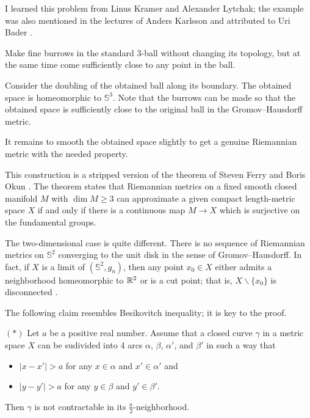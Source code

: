 I learned this problem from Linus Kramer and Alexander Lytchak;
the example was also mentioned in the lectures of Anders Karlsson
and attributed to Uri Bader \cite[see 2.3 in][]{karlsson}.





Make fine burrows in the standard 3-ball without changing its topology,
but at the same time come sufficiently close to any point in the ball.

Consider the doubling of the obtained ball along  its boundary.
The obtained space is homeomorphic to $\mathbb{S}^3$.
Note that the burrows can be made 
so that the obtained space is sufficiently close to the original ball 
in the Gromov--Hausdorff metric.

It remains to smooth the obtained space slightly 
to get a genuine Riemannian metric with the needed property.\qeds


This construction is a stripped version of the theorem of Steven Ferry and Boris Okun \cite[see][]{ferry-okun}.
The theorem states that Riemannian metrics on a fixed smooth closed manifold $M$ with $\dim M\ge 3$ 
can approximate a given compact length-metric space $X$ 
if and only if 
there is a continuous map $M\to X$ which is surjective on the fundamental groups. 

The two-dimensional case is quite different.
There is no sequence of Riemannian metrics on
$\mathbb{S}^2$ converging to the unit disk in the sense of Gromov--Hausdorff.
In fact, 
if $X$ is a limit of $(\mathbb{S}^2,g_n)$,
then any point $x_0\in X$ either admits a neighborhood homeomorphic to $\mathbb{R}^2$ or is a cut point;
that is, $X\backslash\{x_0\}$ is disconnected \cite[see 3.32 in][]{gromov-MetStr}.

The following claim resembles Besikovitch inequality;
it is key to the proof.
\begin{cl}{$({*})$} Let $a$ be a positive real number.
 Assume that a closed curve $\gamma$ in a metric space $X$ can be sudivided into 4 arcs $\alpha$, $\beta$, $\alpha'$, and $\beta'$ in such a way that 
 \begin{itemize}
 \item $|x-x'|>a$ for any $x\in\alpha$ and $x'\in \alpha'$
 and
 \item $|y-y'|>a$ for any $y\in\beta$ and $y'\in \beta'$.
 \end{itemize}
 Then $\gamma$ is not contractable in its $\tfrac a2$-neighborhood.
\end{cl}


